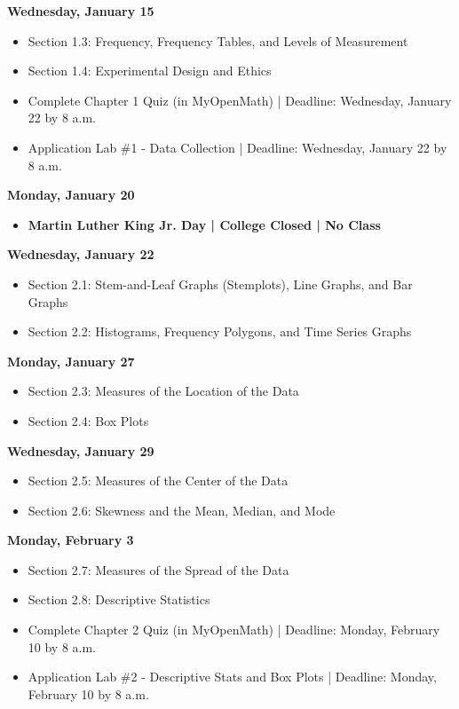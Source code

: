 \documentclass[11pt]{article}
\begin{document}
\textbf{Wednesday, January 15}

\begin{itemize}
\item Section 1.3: Frequency, Frequency Tables, and Levels of Measurement
\item Section 1.4: Experimental Design and Ethics
\item Complete Chapter 1 Quiz (in MyOpenMath) | Deadline: Wednesday, January 22 by 8 a.m.
\item Application Lab \#1 - Data Collection | Deadline: Wednesday, January 22 by 8 a.m.
\end{itemize}

\textbf{Monday, January 20}

\begin{itemize}
\item \textbf{Martin Luther King Jr. Day | College Closed | No Class}
\end{itemize}

\textbf{Wednesday, January 22}

\begin{itemize}
\item Section 2.1: Stem-and-Leaf Graphs (Stemplots), Line Graphs, and Bar Graphs
\item Section 2.2: Histograms, Frequency Polygons, and Time Series Graphs
\end{itemize}

\textbf{Monday, January 27}

\begin{itemize}
\item Section 2.3: Measures of the Location of the Data
\item Section 2.4: Box Plots
\end{itemize}

\textbf{Wednesday, January 29}

\begin{itemize}
\item Section 2.5: Measures of the Center of the Data
\item Section 2.6: Skewness and the Mean, Median, and Mode
\end{itemize}

\textbf{Monday, February 3}

\begin{itemize}
\item Section 2.7: Measures of the Spread of the Data
\item Section 2.8: Descriptive Statistics
\item Complete Chapter 2 Quiz (in MyOpenMath) | Deadline: Monday, February 10 by 8 a.m.
\item Application Lab \#2 - Descriptive Stats and Box Plots | Deadline: Monday, February 10 by 8 a.m.
\end{itemize}
\end{document}
